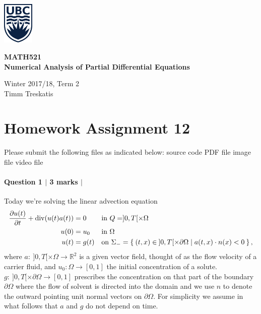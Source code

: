 \documentclass[10pt,letterpaper]{scrartcl}
\begin{document}
\begin{minipage}{.2\textwidth}
\includegraphics[width=42pt]{ubc-logo.png}
\end{minipage}
\hfill
\begin{minipage}{.75\textwidth}
\setlength{\parskip}{6pt}
\begin{flushright}
{\sffamily
\textbf{MATH521}\\
\textbf{Numerical Analysis of Partial Differential Equations}

Winter 2017/18, Term 2\\
Timm Treskatis
}
\end{flushright}
\end{minipage}

\section*{Homework Assignment 12}

Please submit the following files as indicated below: \hfill \faFileCodeO \: source code \hfill \faFilePdfO \: PDF file \hfill \faFilePictureO \: image file \hfill \faFileMovieO \: video file

\paragraph*{Question 1 $\vert$ 3 marks $\vert$ \faFileCodeO{} \: \faFilePdfO}

Today we're solving the linear advection equation
\begin{subequations}\label{eq:advection}
\begin{align}
\frac{\partial u(t)}{\partial t} + \operatorname{div} (u(t)a(t)) &= 0 && \text{in } Q = ]0,T[ \times \Omega\\
u(0) &= u_0 && \text{in } \Omega\\
u(t) &= g(t) && \text{on } \Sigma_- = \Set{(t,x) \in \: ]0,T[ \times \partial\Omega | a(t,x)\cdot n(x) < 0},
\end{align}
\end{subequations}
where $a: \: ]0,T[ \times \Omega \to \mathds{R}^2$ is a given vector field, thought of as the flow velocity of a carrier fluid, and $u_0: \Omega \to [0,1]$ the initial concentration of a solute. $g: \: ]0,T[ \times \partial\Omega \to [0,1]$ prescribes the concentration on that part of the boundary $\partial \Omega$ where the flow of solvent is directed into the domain and we use $n$ to denote the outward pointing unit normal vectors on $\partial \Omega$. For simplicity we assume in what follows that $a$ and $g$ do not depend on time.
\end{document}
